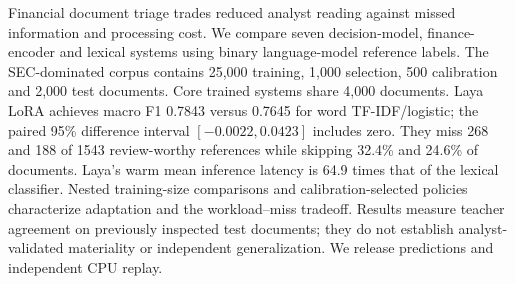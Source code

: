 Financial document triage trades reduced analyst reading against missed information and processing cost. We compare seven decision-model, finance-encoder and lexical systems using binary language-model reference labels. The SEC-dominated corpus contains 25,000 training, 1,000 selection, 500 calibration and 2,000 test documents. Core trained systems share 4,000 documents. Laya LoRA achieves macro F1 0.7843 versus 0.7645 for word TF-IDF/logistic; the paired 95\% difference interval $[-0.0022, 0.0423]$ includes zero. They miss 268 and 188 of 1543 review-worthy references while skipping 32.4\% and 24.6\% of documents. Laya's warm mean inference latency is 64.9 times that of the lexical classifier. Nested training-size comparisons and calibration-selected policies characterize adaptation and the workload--miss tradeoff. Results measure teacher agreement on previously inspected test documents; they do not establish analyst-validated materiality or independent generalization. We release predictions and independent CPU replay.

